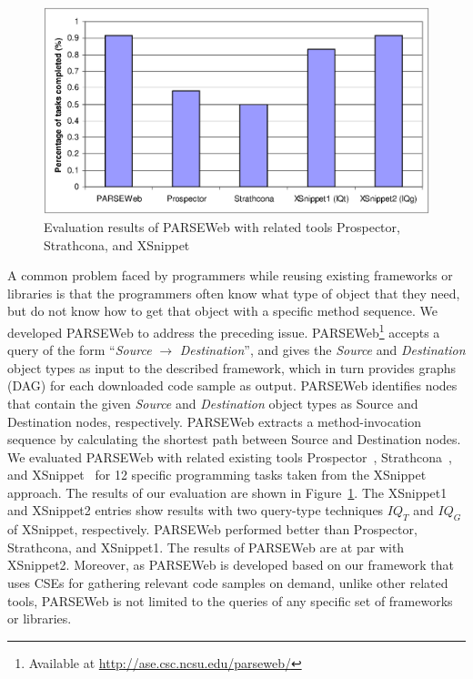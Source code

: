\documentclass{sigplanconf}
\newcommand{\Comment}[1]{}
\begin{document}
\begin{figure}[t]
\centering
\includegraphics[scale=0.48,clip]{ComparisonResults1.eps}
\caption{Evaluation results of PARSEWeb with related tools Prospector, Strathcona, and XSnippet} \label{fig:comparison}
\vspace*{-2ex}
\end{figure}
A common problem faced by programmers while reusing existing
frameworks or libraries is that the programmers often know what type
of object that they need, but do not know how to get that object
with a specific method sequence. We developed PARSEWeb to address
the preceding issue. PARSEWeb\footnote{Available at
\url{http://ase.csc.ncsu.edu/parseweb/}} accepts a query of the form
``\emph{Source} $\rightarrow$ \emph{Destination}'', and gives the
\emph{Source} and \emph{Destination} object types as input to the
described framework, which in turn provides graphs (DAG) for each
downloaded code sample as output. PARSEWeb identifies nodes that
contain the given \emph{Source} and \emph{Destination} object types
as Source and Destination nodes, respectively. PARSEWeb extracts a
method-invocation sequence by calculating the shortest path between
Source and Destination nodes. We evaluated PARSEWeb with related
existing tools Prospector~\cite{prospector:jungloid},
Strathcona~\cite{strathcona:se}, and XSnippet~\cite{xsnippet:saha}
for 12 specific programming tasks taken from the XSnippet approach.
The results of our evaluation are shown in
Figure~\ref{fig:comparison}. The XSnippet1 and XSnippet2 entries
show results with two query-type techniques $IQ_{T}$ and $IQ_{G}$ of
XSnippet, respectively. PARSEWeb performed better than Prospector,
Strathcona, and XSnippet1. The results of PARSEWeb are at par with
XSnippet2. Moreover, as PARSEWeb is developed based on our framework
that uses CSEs for gathering relevant code samples on demand, unlike
other related tools, PARSEWeb is not limited to the queries of any
specific set of frameworks or libraries. \Comment{The results
signify the effectiveness of the underlying framework used by
PARSEWeb. $IQ_{G}$ query type (XSnippet2). However, the
``XSnippet2'' cannot effectively address the issue targeted by
PARSEWeb as this query type simply returns the set of all code
samples contained in the sample repository that instantiate the
given \emph{Destination} object type, irrespective of the
\emph{Source} object type.}
\end{document}
